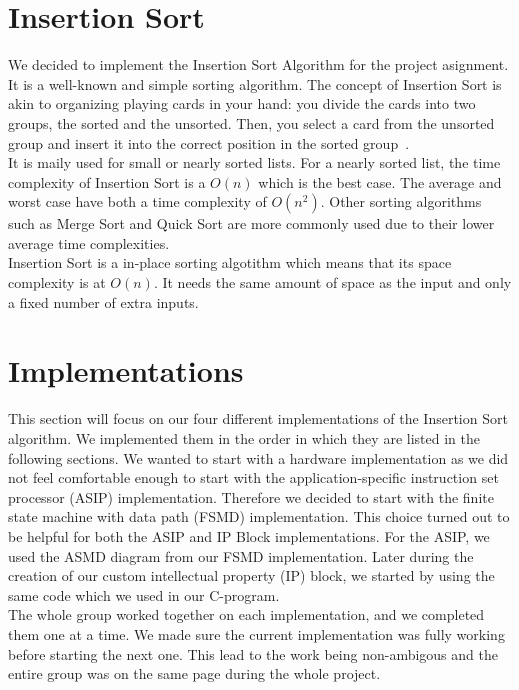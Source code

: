 \documentclass[conference]{IEEEtran}
\begin{document}
\section{Insertion Sort}
We decided to implement the Insertion Sort Algorithm for the project asignment. It is a well-known and simple sorting algorithm. The concept of Insertion Sort is akin to organizing playing cards in your hand: you divide the cards into two groups, the sorted and the unsorted. Then, you select a card from the unsorted group and insert it into the correct position in the sorted group~\cite{g4g}.\\
It is maily used for small or nearly sorted lists. For a nearly sorted list, the time complexity of Insertion Sort is a $O(n)$ which is the best case. The average and worst case have both a time complexity of $O(n^2)$. Other sorting algorithms such as Merge Sort and Quick Sort are more commonly used due to their lower average time complexities.\\
Insertion Sort is a in-place sorting algotithm which means that its space complexity is at $O(n)$. It needs the same amount of space as the input and only a fixed number of extra inputs.

\section{Implementations}
This section will focus on our four different implementations of the Insertion Sort algorithm. We implemented them in the order in which they are listed in the following sections. We wanted to start with a hardware implementation as we did not feel comfortable enough to start with the application-specific instruction set processor (ASIP) implementation. Therefore we decided to start with the finite state machine with data path (FSMD) implementation. This choice turned out to be helpful for both the ASIP and IP Block implementations. For the ASIP, we used the ASMD diagram from our FSMD implementation. Later during the creation of our custom intellectual property (IP) block, we started by using the same code which we used in our C-program. \\
The whole group worked together on each implementation, and we completed them one at a time. We made sure the current implementation was fully working before starting the next one. This lead to the work being non-ambigous and the entire group was on the same page during the whole project.
\end{document}
